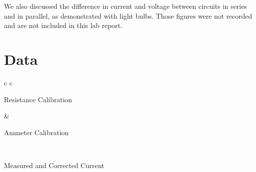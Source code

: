 \documentclass[12pt,letterpaper,titlepage]{report}
\begin{document}
\medskip
We also discussed the difference in current and voltage between circuits in series and in parallel, as demonstrated with light bulbs. Those figures were not recorded and are not included in this lab report.




\pagebreak
\section*{Data}

\bigskip
\bigskip

\begin{minipage}{\textwidth}
    \centering
    \begin{tabular}[t]{c c}
        
        \begin{minipage}{.4\textwidth}
            \centering
            \bigskip
            Resistance Calibration \\
            \bigskip
            
            \bigskip
            \bigskip %
            \bigskip %
            \bigskip
            \medskip %
        \end{minipage} &
        
        \begin{minipage}{.4\textwidth}
            \centering
            \bigskip
            Ammeter Calibration \\
            \bigskip
            
            \bigskip
            \bigskip
        \end{minipage} \\
        
        
         {
            \begin{minipage}{.4\textwidth}
                \centering
                \bigskip
                \bigskip
                Measured and Corrected Current \\
                \bigskip
                
                \bigskip
            \end{minipage}
        }
                
    \end{tabular}
\end{minipage}
\end{document}
